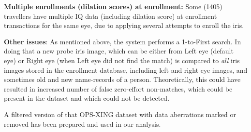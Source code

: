 \documentclass{cta-author}%
\begin{document}
\textbf{Multiple enrollments (dilation scores) at enrollment:} Some 
(1405) 
travellers have multiple IQ data (including dilation score) at enrollment transactions for the same eye, due to applying several attempts to enroll the iris.


\textbf{Other issues}:  As mentioned above, the system performs a 1-to-First search. In doing that a new probe iris image, which can be either from  Left eye (default eye) or Right eye (when Left eye did not find the match) is compared to \textit{all} iris images stored in the enrollment database, including left and right eye images, and sometimes old and new name-records of a person.  Theoretically, this could have resulted in increased number of false zero-effort non-matches, which could be present in the dataset and which could not be detected. 




A  filtered  version of that OPS-XING  dataset with
data aberrations marked or removed has been prepared and used in our analysis.



\end{document}
